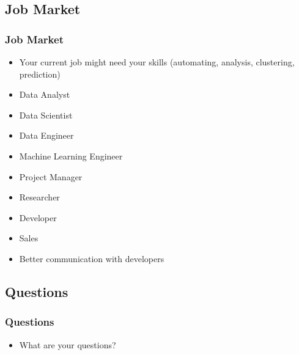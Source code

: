 \subsection{Job Market}
\begin{frame}\frametitle{Job Market}
   \begin{itemize}
      \item Your current job might need your skills (automating, analysis, clustering, prediction)
      \item Data Analyst
      \item Data Scientist
      \item Data Engineer
      \item Machine Learning Engineer
      \item Project Manager
      \item Researcher
      \item Developer
      \item Sales
      \item Better communication with developers
   \end{itemize}
\end{frame}

\subsection{Questions}
\begin{frame}\frametitle{Questions}
   \begin{itemize}
      \item What are your questions?
   \end{itemize}
\end{frame}





